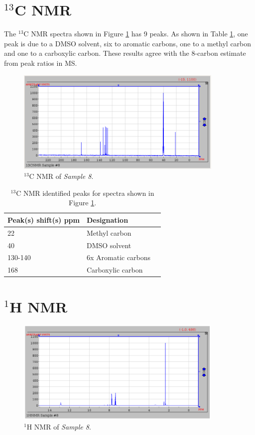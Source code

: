 \documentclass[8.5pt,twoside,twocolumn]{article}
\begin{document}
\section{$^{13}$C NMR}
The $^{13}$C NMR spectra shown in Figure \ref{fig:CNMR} has 9 peaks. As shown in Table \ref{table:MS}, one peak is due to a DMSO solvent, six to aromatic carbons, one to a methyl carbon and one to a carboxylic carbon. These results agree with the 8-carbon estimate from peak ratios in MS.\\

\begin{figure}[h]
\centering
  \includegraphics[height=5cm]{figures/CNMR.png}
  \caption{$^{13}$C NMR of \textit{Sample 8}.}
  \label{fig:CNMR}
\end{figure}

\begin{table}[h]
\small
  \caption{$^{13}$C NMR identified peaks for spectra shown in Figure \ref{fig:CNMR}.}
  \label{table:MS}
  \begin{tabular*}{0.5\textwidth}{@{\extracolsep{\fill}}lll}
    \hline
    Peak(s) shift(s) ppm & Designation \\
    \hline
    22 & Methyl carbon \\
    40 & DMSO solvent\\
    130-140 & 6x Aromatic carbons\\
    168 & Carboxylic carbon\\
    \hline
  \end{tabular*}
\end{table}

\section{$^{1}$H NMR}

\begin{figure}[h]
\centering
  \includegraphics[height=5cm]{figures/HNMR.png}
  \caption{$^{1}$H NMR of \textit{Sample 8}.}
  \label{fig:HNMR}
\end{figure}
\end{document}
